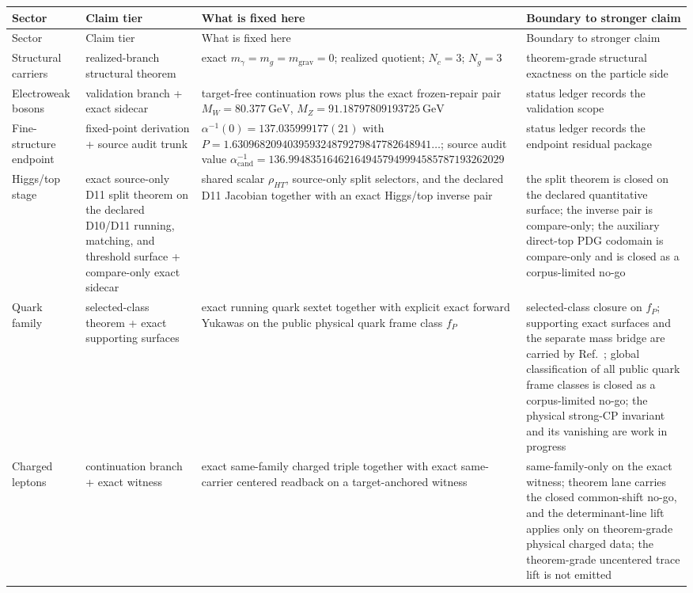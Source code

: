 \scriptsize
\setlength{\tabcolsep}{2pt}
\begin{longtable}{@{}>{\raggedright\arraybackslash}p{}>{\raggedright\arraybackslash}p{}>{\raggedright\arraybackslash}p{}>{\raggedright\arraybackslash}p{}@{}}
\toprule
Sector & Claim tier & What is fixed here & Boundary to stronger claim \\
\midrule
\endfirsthead
\toprule
Sector & Claim tier & What is fixed here & Boundary to stronger claim \\
\midrule
\endhead
\bottomrule
\endfoot
Structural carriers & realized-branch structural theorem & exact \(m_\gamma=m_g=m_{\mathrm{grav}}=0\); realized quotient; \(N_c=3\); \(N_g=3\) & theorem-grade structural exactness on the particle side \\
Electroweak bosons & validation branch + exact sidecar & target-free continuation rows plus the exact frozen-repair pair \(M_W=80.377~\mathrm{GeV}\), \(M_Z=91.18797809193725~\mathrm{GeV}\) & status ledger records the validation scope \\
Fine-structure endpoint & fixed-point derivation + source audit trunk & \(\alpha^{-1}(0)=137.035999177(21)\) with \(P=1.630968209403959324879279847782648941\ldots\); source audit value \(\alpha_{\mathrm{cand}}^{-1}=136.994835164621649457949994585787193262029\) & status ledger records the endpoint residual package \\
Higgs/top stage & exact source-only D11 split theorem on the declared D10/D11 running, matching, and threshold surface + compare-only exact sidecar & shared scalar \(\rho_{HT}\), source-only split selectors, and the declared D11 Jacobian together with an exact Higgs/top inverse pair & the split theorem is closed on the declared quantitative surface; the inverse pair is compare-only; the auxiliary direct-top PDG codomain is compare-only and is closed as a corpus-limited no-go \\
Quark family & selected-class theorem + exact supporting surfaces & exact running quark sextet together with explicit exact forward Yukawas on the public physical quark frame class \(f_P\) & selected-class closure on \(f_P\); supporting exact surfaces and the separate mass bridge are carried by Ref.~\cite{ophparticles}; global classification of all public quark frame classes is closed as a corpus-limited no-go; the physical strong-CP invariant and its vanishing are work in progress \\
Charged leptons & continuation branch + exact witness & exact same-family charged triple together with exact same-carrier centered readback on a target-anchored witness & same-family-only on the exact witness; theorem lane carries the closed common-shift no-go, and the determinant-line lift applies only on theorem-grade physical charged data; the theorem-grade uncentered trace lift is not emitted \\

\end{longtable}
